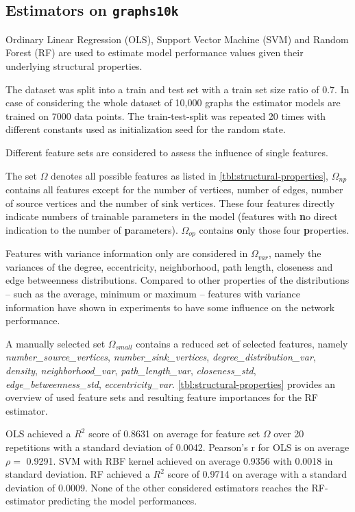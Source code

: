 \documentclass[runningheads]{llncs}
\begin{document}
\subsection{Estimators on \texttt{graphs10k}}\label{sec:estimators}
Ordinary Linear Regression (OLS), Support Vector Machine (SVM) and Random Forest (RF) are used to estimate model performance values given their underlying structural properties.

The dataset was split into a train and test set with a train set size ratio of 0.7.
In case of considering the whole dataset of 10,000 graphs the estimator models are trained on 7000 data points.
The train-test-split was repeated 20 times with different constants used as initialization seed for the random state.

Different feature sets are considered to assess the influence of single features.

The set $\Omega$ denotes all possible features as listed in \autoref{tbl:structural-properties}, $\Omega_{np}$ contains all features except for the number of vertices, number of edges, number of source vertices and the number of sink vertices.
These four features directly indicate numbers of trainable parameters in the model (features with \textbf{n}o direct indication to the number of \textbf{p}arameters).
$\Omega_{op}$ contains \textbf{o}nly those four \textbf{p}roperties.

Features with variance information only are considered in $\Omega_{var}$, namely the variances of the degree, eccentricity, neighborhood, path length, closeness and edge betweenness distributions.
Compared to other properties of the distributions -- such as the average, minimum or maximum -- features with variance information have shown in experiments to have some influence on the network performance.

A manually selected set $\Omega_{small}$ contains a reduced set of selected features, namely \textit{number\_source\_vertices}, \textit{number\_sink\_vertices}, \textit{degree\_distribution\_var}, \textit{density}, \textit{neighborhood\_var}, \textit{path\_length\_var}, \textit{closeness\_std}, \textit{edge\_betweenness\_std}, \textit{eccentricity\_var}.
\autoref{tbl:structural-properties} provides an overview of used feature sets and resulting feature importances for the RF estimator.

OLS achieved a $R^2$ score of 0.8631 on average for feature set $\Omega$ over 20 repetitions with a standard deviation of 0.0042.
Pearson's r for OLS is on average $\rho =$ 0.9291.
SVM with RBF kernel achieved on average 0.9356 with 0.0018 in standard deviation.
RF achieved a $R^2$ score of 0.9714 on average with a standard deviation of 0.0009.
None of the other considered estimators reaches the RF-estimator predicting the model performances.
\end{document}
